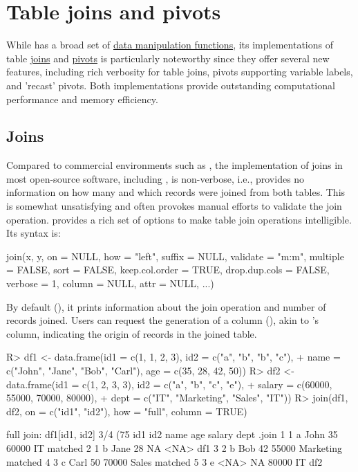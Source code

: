 \documentclass[nojss]{jss} %
\begin{document}
\section{Table joins and pivots} \label{sec:join_pivot}
%
While  has a broad set of \href{https://sebkrantz.github.io/collapse/reference/fast-data-manipulation.html}{data manipulation functions}, its implementations of table \href{https://sebkrantz.github.io/collapse/reference/join.html}{joins} and \href{https://sebkrantz.github.io/collapse/reference/pivot.html}{pivots} is particularly noteworthy since they offer several new features, including rich verbosity for table joins, pivots supporting variable labels, and 'recast' pivots. Both implementations provide outstanding computational performance and memory efficiency.
%
\subsection{Joins}
%
Compared to commercial environments such as , the implementation of joins in most open-source software, including , is non-verbose, i.e., provides no information on how many and which records were joined from both tables. This is somewhat unsatisfying and often provokes manual efforts to validate the join operation.  provides a rich set of options to make table join operations intelligible. Its syntax is:
\begin{Code}
join(x, y, on = NULL, how = "left", suffix = NULL, validate = "m:m",
  multiple = FALSE, sort = FALSE, keep.col.order = TRUE,
  drop.dup.cols = FALSE, verbose = 1, column = NULL, attr = NULL, ...)
\end{Code}
By default (), it prints information about the join operation and number of records joined. Users can request the generation of a  column (), akin to 's  column, indicating the origin of records in the joined table.
%
\begin{Schunk}
\begin{Sinput}
R> df1 <- data.frame(id1 = c(1, 1, 2, 3), id2 = c("a", "b", "b", "c"),
+    name = c("John", "Jane", "Bob", "Carl"), age = c(35, 28, 42, 50))
R> df2 <- data.frame(id1 = c(1, 2, 3, 3), id2 = c("a", "b", "c", "e"),
+    salary = c(60000, 55000, 70000, 80000),
+    dept = c("IT", "Marketing", "Sales", "IT"))
R> join(df1, df2, on = c("id1", "id2"), how = "full", column = TRUE)
\end{Sinput}
\begin{Soutput}
full join: df1[id1, id2] 3/4 (75%) <m:m> df2[id1, id2] 3/4 (75%)
  id1 id2 name age salary      dept   .join
1   1   a John  35  60000        IT matched
2   1   b Jane  28     NA      <NA>     df1
3   2   b  Bob  42  55000 Marketing matched
4   3   c Carl  50  70000     Sales matched
5   3   e <NA>  NA  80000        IT     df2
\end{Soutput}
\end{Schunk}
\end{document}
